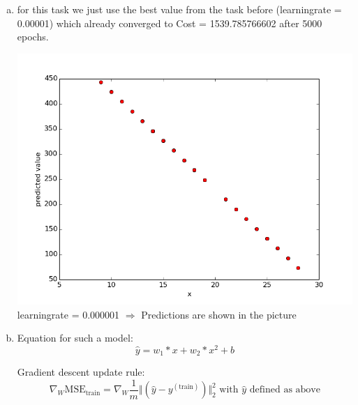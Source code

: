 \documentclass[12pt]{article}
\begin{document}
\begin{enumerate}[a)]
    \item 
        for this task we just use the best value from the task before (learningrate = 0.00001) which already converged to Cost = 1539.785766602 after 5000 epochs. 
		\begin{center}
                    \includegraphics[scale = 0.52]{pictures/onedimprediction.png}\\
                    learningrate = 0.000001 $\Rightarrow$ Predictions are shown in the picture\\
         \end{center}
    \item 
         Equation for such a model:
        $$ \hat{y} = w_1*x + w_2*x^2 + b $$

        Gradient descent update rule:
        $$ \nabla_W \text{MSE}_\text{train} = \nabla_W \frac{1}{m} \Vert (\hat{y} - y^{(\text{train})}) \Vert^2_2 \text{ with } \hat{y} \text{ defined as above}$$\\


\end{enumerate}
\end{document}
